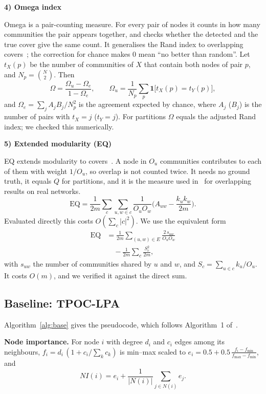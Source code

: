 \documentclass[conference]{IEEEtran}
\newcommand{\metrichead}[1]{\par\smallskip\noindent\textbf{#1}\par\nobreak\vspace{1pt}}
\begin{document}
\metrichead{4) Omega index}
Omega is a pair-counting measure. For every pair of nodes it counts in how many communities the pair appears together, and checks whether the detected and the true cover give the same count. It generalises the Rand index to overlapping covers~\cite{collins1988}; the correction for chance makes 0 mean ``no better than random''. Let $t_X(p)$ be the number of communities of $X$ that contain both nodes of pair $p$, and $N_p=\binom N2$. Then
\begin{equation}
\Omega=\frac{\Omega_u-\Omega_e}{1-\Omega_e},\qquad\Omega_u=\frac1{N_p}\sum_p\mathbf 1\big[t_X(p)=t_Y(p)\big],\label{eq:omega}
\end{equation}
and $\Omega_e=\sum_jA_jB_j/N_p^2$ is the agreement expected by chance, where $A_j$ ($B_j$) is the number of pairs with $t_X=j$ ($t_Y=j$). For partitions $\Omega$ equals the adjusted Rand index; we checked this numerically.

\metrichead{5) Extended modularity (EQ)}
EQ extends modularity to covers~\cite{shen2009}. A node in $O_u$ communities contributes to each of them with weight $1/O_u$, so overlap is not counted twice. It needs no ground truth, it equals $Q$ for partitions, and it is the measure used in~\cite{kong2026} for overlapping results on real networks.
\begin{equation}
\mathrm{EQ}=\frac1{2m}\sum_c\sum_{u,w\in c}\frac{1}{O_uO_w}\Big(A_{uw}-\frac{k_uk_w}{2m}\Big).\label{eq:eq}
\end{equation}
Evaluated directly this costs $O(\sum_c|c|^2)$. We use the equivalent form
\begin{equation}
\begin{split}
\mathrm{EQ}&=\frac1{2m}\sum_{(u,w)\in E}\frac{2\,s_{uw}}{O_uO_w}\\
&\quad-\frac1{2m}\sum_c\frac{S_c^{2}}{2m},
\end{split}
\end{equation}
with $s_{uw}$ the number of communities shared by $u$ and $w$, and $S_c=\sum_{u\in c}k_u/O_u$. It costs $O(m)$, and we verified it against the direct sum.

\subsection{Baseline: TPOC-LPA}\label{sec:base}
Algorithm~\ref{alg:base} gives the pseudocode, which follows Algorithm~1 of~\cite{kong2026}. 

\textbf{Node importance.} For node $i$ with degree $d_i$ and $c_i$ edges among its neighbours, $f_i=d_i\,(1+c_i/\sum_kc_k)$ is min--max scaled to $e_i=0.5+0.5\,\frac{f_i-f_{\min}}{f_{\max}-f_{\min}}$, and
\begin{equation}
NI(i)=e_i+\frac1{|N(i)|}\sum_{j\in N(i)}e_j.\label{eq:ni}
\end{equation}
\end{document}
